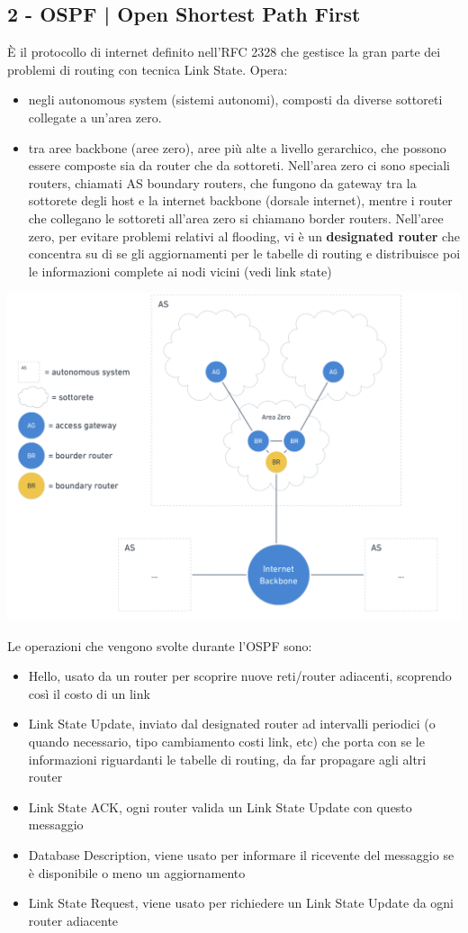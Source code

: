 \documentclass[11pt, oneside]{article}   	%
\begin{document}
\subsection*{2 - OSPF | Open Shortest Path First}
È il protocollo di internet definito nell'RFC 2328 che gestisce la gran parte dei problemi di routing con tecnica Link State. Opera:\begin{itemize}
\item negli autonomous system (sistemi autonomi), composti da diverse sottoreti
collegate a un'area zero.
\item tra aree backbone (aree zero), aree più alte a livello gerarchico, che possono essere composte sia da router che da sottoreti. Nell'area zero ci sono speciali routers, chiamati AS boundary routers, che fungono da gateway tra la sottorete degli host e la internet backbone (dorsale internet), mentre i router che collegano le sottoreti all'area zero si chiamano border routers. Nell'aree zero, per evitare problemi relativi al flooding, vi è un \textbf{designated router} che concentra su di se gli aggiornamenti per le tabelle di routing e distribuisce poi le informazioni complete ai nodi vicini (vedi link state)
\end{itemize}
\begin{center}
\includegraphics[scale=0.5]{route}
\end{center}
Le operazioni che vengono svolte durante l'OSPF sono:
\begin{itemize}
\item Hello, usato da un router per scoprire nuove reti/router adiacenti, scoprendo così il costo di un link
\item Link State Update, inviato dal designated router ad intervalli periodici (o quando necessario, tipo cambiamento costi link, etc) che porta con se le informazioni riguardanti le tabelle di routing, da far propagare agli altri router
\item Link State ACK, ogni router valida un Link State Update con questo messaggio 
\item Database Description, viene usato per informare il ricevente del messaggio se è disponibile o meno un aggiornamento
\item Link State Request, viene usato per richiedere un Link State Update da ogni router adiacente
\end{itemize}
\end{document}
